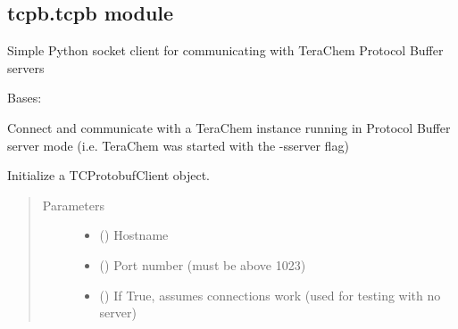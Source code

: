 \documentclass[letterpaper,10pt,english]{sphinxmanual}
\begin{document}
\subsection{tcpb.tcpb module}
\label{\detokenize{tcpb:tcpb-tcpb-module}}\label{\detokenize{tcpb:module-tcpb.tcpb}}
Simple Python socket client for communicating with TeraChem Protocol Buffer servers

\begin{fulllineitems}
\label{\detokenize{tcpb:tcpb.tcpb.TCProtobufClient}}
Bases: 

Connect and communicate with a TeraChem instance running in Protocol Buffer server mode
(i.e. TeraChem was started with the -s\textbar{}\textendash{}server flag)

\begin{fulllineitems}
\label{\detokenize{tcpb:tcpb.tcpb.TCProtobufClient.__init__}}
Initialize a TCProtobufClient object.
\begin{quote}\begin{description}
\item[{Parameters}] \leavevmode\begin{itemize}
\item {} 
 () \textendash{} Hostname

\item {} 
 () \textendash{} Port number (must be above 1023)

\item {} 
 () \textendash{} If True, assumes connections work (used for testing with no server)


\end{itemize}
\end{description}
\end{quote}
\end{fulllineitems}
\end{fulllineitems}
\end{document}
